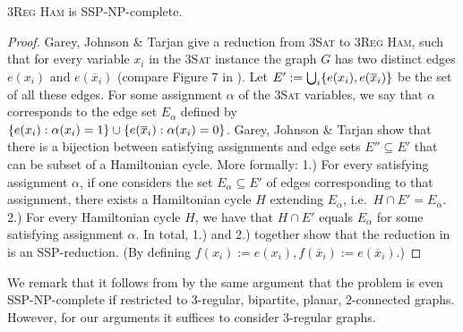 \begin{lemma}
\label{lem:3-reg-ham-ssp}
    \textsc{3Reg Ham} is SSP-NP-complete.
\end{lemma}
\begin{proof}
    Garey, Johnson \& Tarjan \cite{DBLP:journals/siamcomp/GareyJT76} give a reduction from \textsc{3Sat} to  \textsc{3Reg Ham}, such that for every variable $x_i$ in the \textsc{3Sat} instance the graph $G$ has two distinct edges $e(x_i)$ and $e(\overline x_i)$ (compare Figure 7 in \cite{DBLP:journals/siamcomp/GareyJT76}). Let $E' := \bigcup_i \{ e(x_i), e(\overline x_i) \}$ be the set of all these edges. For some assignment $\alpha$ of the \textsc{3Sat} variables, we say that $\alpha$ corresponds to the edge set $E_\alpha$ defined by $\{ e(x_i) : \alpha(x_i) = 1 \} \cup \{ e(\overline x_i) : \alpha(x_i) = 0 \}$.
    Garey, Johnson \& Tarjan show that there is a bijection between satisfying assignments and edge sets $E'' \subseteq E'$ that can be subset of a Hamiltonian cycle. More formally: 1.) For every satisfying assignment $\alpha$, 
    if one considers the set $E_\alpha \subseteq E'$ of edges corresponding to that assignment, 
    there exists a Hamiltonian cycle $H$ extending $E_\alpha$, i.e.\ $H \cap E' = E_\alpha$. 
    2.) For every Hamiltonian cycle $H$, we have that $H \cap E'$ equals $E_\alpha$ for some satisfying assignment $\alpha$.
    In total, 1.) and 2.) together show that the reduction in \cite{DBLP:journals/siamcomp/GareyJT76} is an SSP-reduction. (By defining $f(x_i) := e(x_i), f(\overline x_i) := e(\overline x_i)$.)
\end{proof}

We remark that it follows from \cite{akiyama1980np,DBLP:journals/siamcomp/GareyJT76} by the same argument that the problem is even SSP-NP-complete if restricted to 3-regular, bipartite, planar, 2-connected graphs. However, for our arguments it suffices to consider 3-regular graphs.

